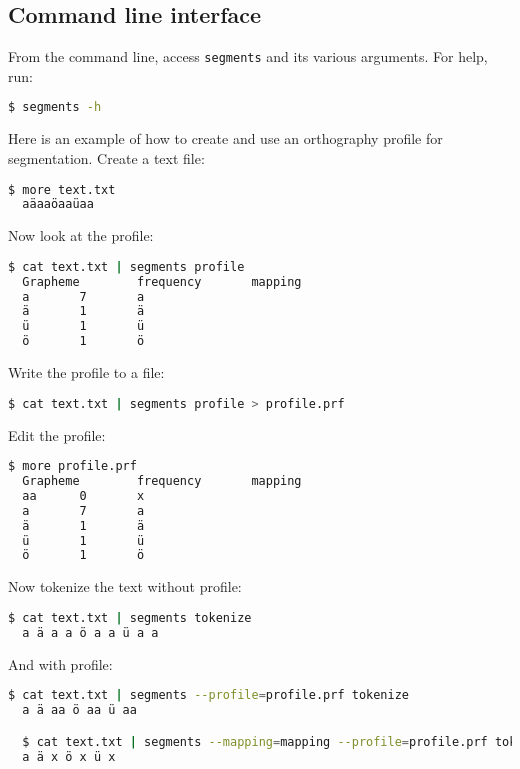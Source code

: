 \documentclass[output=inprep,
		biblatex
		]{LSP/langsci}\usepackage[]{graphicx}\usepackage[]{color}
\begin{document}
\subsection*{Command line interface}

From the command line, access \texttt{segments} and its 
various arguments. For help, run:

\begin{lstlisting}[language=bash]
  $ segments -h
\end{lstlisting}

\noindent Here is an example of how to create and use an orthography 
profile for segmentation. Create a text file:

\begin{lstlisting}[language=bash]
  $ more text.txt
  aäaaöaaüaa
\end{lstlisting}

\noindent Now look at the profile:

\begin{lstlisting}[language=bash,texcl=true]
  $ cat text.txt | segments profile
  Grapheme        frequency       mapping
  a       7       a
  ä       1       ä
  ü       1       ü
  ö       1       ö
\end{lstlisting}

\noindent Write the profile to a file:

\begin{lstlisting}[language=bash]
  $ cat text.txt | segments profile > profile.prf
\end{lstlisting}

\noindent Edit the profile:

\begin{lstlisting}[language=bash]
  $ more profile.prf
  Grapheme        frequency       mapping
  aa      0       x
  a       7       a
  ä       1       ä
  ü       1       ü
  ö       1       ö
\end{lstlisting}

\noindent Now tokenize the text without profile:

\begin{lstlisting}[language=bash]
  $ cat text.txt | segments tokenize
  a ä a a ö a a ü a a	
\end{lstlisting}

\noindent And with profile:
\begin{lstlisting}[language=bash]
  $ cat text.txt | segments --profile=profile.prf tokenize
  a ä aa ö aa ü aa

  $ cat text.txt | segments --mapping=mapping --profile=profile.prf tokenize
  a ä x ö x ü x
\end{lstlisting}
\end{document}
